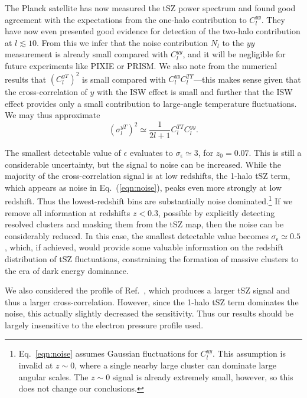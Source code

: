 \documentclass[aps,twocolumn,floats,prd,nofootinbib,10pt,floatfix]{revtex4-1}
\begin{document}
The Planck satellite has now measured the tSZ power spectrum and
found good agreement with the expectations from the one-halo
contribution to $C_l^{yy}$.  They have now even presented good
evidence for detection of the two-halo contribution at
$l\lesssim 10$.  From this we infer that the noise contribution
$N_l$ to the $yy$ measurement is already small compared with
$C_l^{yy}$, and it will be negligible for future experiments
like PIXIE or PRISM.  We also note from the numerical results
that $\left(C_l^{yT}\right)^2$ is small compared with $C_l^{yy}
C_l^{TT}$---this makes sense given that the cross-correlation of
$y$ with the ISW effect is small and further that the ISW effect
provides only a small contribution to large-angle temperature
fluctuations.  We may thus approximate
\begin{equation}
     \left(\sigma_l^{yT} \right)^2 \simeq \frac{1}{2l+1}
     C_l^{TT} C_l^{yy}.
\label{eqn:noiseapprox}     
\end{equation}

The smallest detectable value of $\epsilon$ evaluates to
$\sigma_\epsilon \simeq 3$, for $z_0 = 0.07$. 
This is still a considerable uncertainty, but the signal to noise can be
increased.  While the majority of the cross-correlation signal
is at low redshifts, the 1-halo tSZ term, which appears as noise
in Eq.~(\ref{eqn:noise}), peaks even more strongly at low
redshift. Thus the lowest-redshift bins are substantially noise
dominated.\footnote{Eq.~\ref{eqn:noise} assumes Gaussian fluctuations for $C_l^{yy}$. 
This assumption is invalid at $z\sim 0$, where a single nearby large 
cluster can dominate large angular scales. The $z\sim 0$ signal is 
already extremely small, however, so this does not change our conclusions.}
If we remove all information at redshifts $z < 0.3$,
possible by explicitly detecting resolved clusters and masking
them from the tSZ map, then the noise can be considerably
reduced.  In this case, the smallest detectable value becomes
$\sigma_\epsilon \simeq 0.5$, which, if achieved, would
provide some valuable information on the redshift distribution
of tSZ fluctuations, constraining the formation of massive clusters 
to the era of dark energy dominance.

We also considered the profile of Ref.~\cite{Komatsu:2002wc}, 
which produces a larger tSZ signal and thus a larger cross-correlation. 
However, since the 1-halo tSZ term dominates the noise, this actually 
slightly decreased the sensitivity. Thus our results should be largely
insensitive to the electron pressure profile used.
\end{document}
